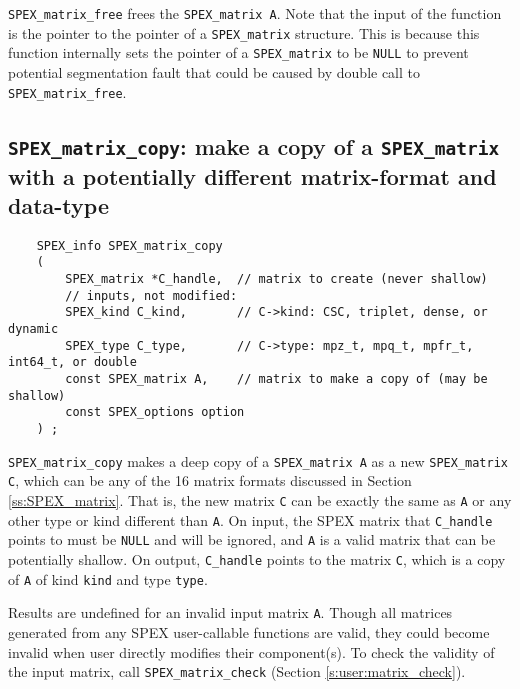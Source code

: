\documentclass[12pt,oneside]{book}
\theoremstyle{definition}
\begin{document}
\verb|SPEX_matrix_free| frees the \verb|SPEX_matrix A|.  Note that the input
of the function is the pointer to the pointer of a \verb|SPEX_matrix|
structure. This is because this function internally sets the pointer of a
\verb|SPEX_matrix| to be \verb|NULL| to prevent potential segmentation fault
that could be caused by double call to  \verb|SPEX_matrix_free|.

\subsection{\texttt{SPEX\_matrix\_copy}: make a copy of a \texttt{SPEX\_matrix} with a potentially different matrix-format and data-type} \label{s:user:matrix_copy}
\begin{mdframed}[userdefinedwidth=\textwidth]
{\footnotesize
\begin{verbatim}
    SPEX_info SPEX_matrix_copy
    (
        SPEX_matrix *C_handle,  // matrix to create (never shallow)
        // inputs, not modified:
        SPEX_kind C_kind,       // C->kind: CSC, triplet, dense, or dynamic
        SPEX_type C_type,       // C->type: mpz_t, mpq_t, mpfr_t, int64_t, or double
        const SPEX_matrix A,    // matrix to make a copy of (may be shallow)
        const SPEX_options option
    ) ;
\end{verbatim}
} \end{mdframed}

\verb|SPEX_matrix_copy| makes a deep copy of a \verb|SPEX_matrix A| as a new \verb|SPEX_matrix C|, which can be any of the 16 matrix formats discussed in Section \ref{ss:SPEX_matrix}. That is, the new matrix \verb|C| can be exactly the same as \verb|A| or any other type or kind
different than \verb|A|.  On input, the SPEX matrix that \verb|C_handle| points to must be \verb|NULL| and will be ignored, and \verb|A| is a valid matrix that can be potentially shallow. On output, \verb|C_handle| points to the matrix
\verb|C|, which is a copy of \verb|A| of kind \verb|kind| and type \verb|type|. 


Results are undefined for an invalid input matrix \verb|A|. Though all matrices generated from any SPEX user-callable functions are valid, they could become invalid when user directly modifies their component(s). To check the validity of the input matrix, call
\verb|SPEX_matrix_check| (Section \ref{s:user:matrix_check}).
\end{document}
